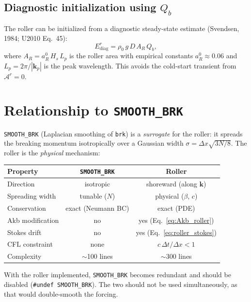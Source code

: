 \documentclass[11pt]{article}
\begin{document}
\subsection*{Diagnostic initialization using $Q_b$}

The roller can be initialized from a diagnostic steady-state estimate
(Svendsen, 1984; U2010 Eq.~45):
\begin{equation}
  E^r_{\mathrm{diag}} = \rho_0\,g\,D\,A_R\,Q_b,
\end{equation}
where $A_R = a_R^0\,H_s\,L_p$ is the roller area with empirical constants
$a_R^0 \approx 0.06$ and $L_p = 2\pi/|\mathbf{k}_p|$ is the peak
wavelength. This avoids the cold-start transient from $\mathscr{A}^r = 0$.

\section{Relationship to \texttt{SMOOTH\_BRK}}

\texttt{SMOOTH\_BRK} (Laplacian smoothing of \texttt{brk}) is a
\emph{surrogate} for the roller: it spreads the breaking momentum
isotropically over a Gaussian width $\sigma = \Delta x\sqrt{3N/8}$.
The roller is the \emph{physical} mechanism:

\medskip
\begin{center}
\begin{tabular}{@{}lcc@{}}
\toprule
Property & \texttt{SMOOTH\_BRK} & Roller \\
\midrule
Direction        & isotropic & shoreward (along $\mathbf{k}$) \\
Spreading width  & tunable ($N$) & physical ($\beta$, $c$) \\
Conservation     & exact (Neumann BC) & exact (PDE) \\
Akb modification & no & yes (Eq.~\ref{eq:Akb_roller}) \\
Stokes drift     & no & yes (Eq.~\ref{eq:roller_stokes}) \\
CFL constraint   & none & $c\,\Delta t/\Delta x < 1$ \\
Complexity       & $\sim$100 lines & $\sim$300 lines \\
\bottomrule
\end{tabular}
\end{center}

\medskip\noindent
With the roller implemented, \texttt{SMOOTH\_BRK} becomes redundant and
should be disabled (\texttt{\#undef SMOOTH\_BRK}). The two should not be
used simultaneously, as that would double-smooth the forcing.
\end{document}
